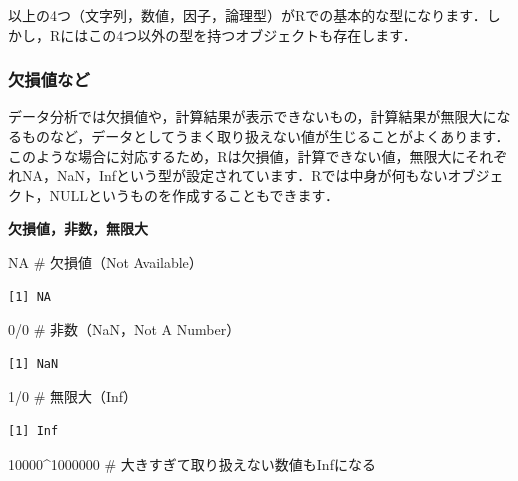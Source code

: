 \documentclass[
  letterpaper,
  DIV=11,
  numbers=noendperiod]{scrreprt}
\newenvironment{Shaded}{\begin{snugshade}}{\end{snugshade}}
\newcommand{\CommentTok}[1]{\textcolor[rgb]{0.37,0.37,0.37}{#1}}
\newcommand{\ConstantTok}[1]{\textcolor[rgb]{0.56,0.35,0.01}{#1}}
\newcommand{\DecValTok}[1]{\textcolor[rgb]{0.68,0.00,0.00}{#1}}
\newcommand{\SpecialCharTok}[1]{\textcolor[rgb]{0.37,0.37,0.37}{#1}}
\begin{document}
以上の4つ（文字列，数値，因子，論理型）がRでの基本的な型になります．しかし，Rにはこの4つ以外の型を持つオブジェクトも存在します．

\hypertarget{ux6b20ux640dux5024ux306aux3069}{%
\subsubsection{欠損値など}\label{ux6b20ux640dux5024ux306aux3069}}

データ分析では欠損値や，計算結果が表示できないもの，計算結果が無限大になるものなど，データとしてうまく取り扱えない値が生じることがよくあります．このような場合に対応するため，Rは欠損値，計算できない値，無限大にそれぞれNA，NaN，Infという型が設定されています．Rでは中身が何もないオブジェクト，NULLというものを作成することもできます．

\textbf{欠損値，非数，無限大}

\begin{Shaded}
\begin{Highlighting}[]
\ConstantTok{NA} \CommentTok{\# 欠損値（Not Available）}
\end{Highlighting}
\end{Shaded}

\begin{verbatim}
[1] NA
\end{verbatim}

\begin{Shaded}
\begin{Highlighting}[]
\DecValTok{0}\SpecialCharTok{/}\DecValTok{0} \CommentTok{\# 非数（NaN，Not A Number）}
\end{Highlighting}
\end{Shaded}

\begin{verbatim}
[1] NaN
\end{verbatim}

\begin{Shaded}
\begin{Highlighting}[]
\DecValTok{1}\SpecialCharTok{/}\DecValTok{0} \CommentTok{\# 無限大（Inf）}
\end{Highlighting}
\end{Shaded}

\begin{verbatim}
[1] Inf
\end{verbatim}

\begin{Shaded}
\begin{Highlighting}[]
\DecValTok{10000}\SpecialCharTok{\^{}}\DecValTok{1000000} \CommentTok{\# 大きすぎて取り扱えない数値もInfになる}
\end{Highlighting}
\end{Shaded}
\end{document}
